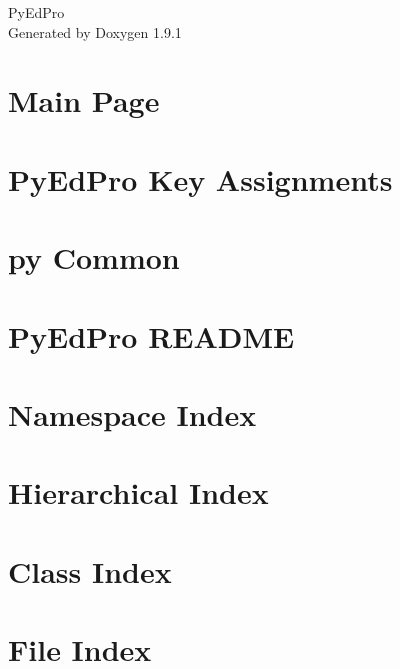 \let\mypdfximage\pdfximage\def\pdfximage{\immediate\mypdfximage}\documentclass[twoside]{book}
\newcommand{\+}{\discretionary{\mbox{\scriptsize$\hookleftarrow$}}{}{}}
\newcommand{\clearemptydoublepage}{%
  \newpage{\pagestyle{empty}\cleardoublepage}%
}
\begin{document}
\raggedbottom

\hypersetup{pageanchor=false,
             bookmarksnumbered=true,
             pdfencoding=unicode
            }
\begin{titlepage}
\vspace*{7cm}
\begin{center}%
{\Large Py\+Ed\+Pro }\\
\vspace*{1cm}
{\large Generated by Doxygen 1.9.1}\\
\end{center}
\end{titlepage}
\clearemptydoublepage
{}
\tableofcontents
\clearemptydoublepage
{}
\hypersetup{pageanchor=true}

\chapter{Main Page}
\label{index}\hypertarget{index}{}
\chapter{Py\+Ed\+Pro Key Assignments}
\label{md_KEYMAP}

\chapter{py Common}
\label{md_pycommon_README}

\chapter{Py\+Ed\+Pro README}
\label{md_README}

\chapter{Namespace Index}

\chapter{Hierarchical Index}

\chapter{Class Index}

\chapter{File Index}

\end{document}
